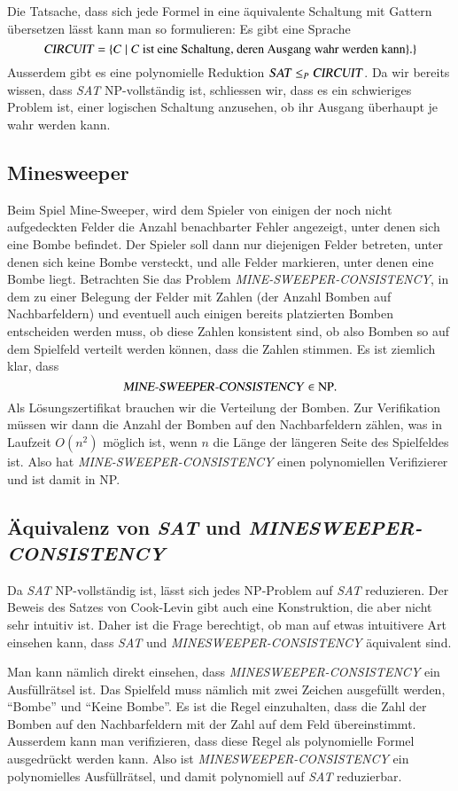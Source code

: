 Die Tatsache, dass sich jede Formel in eine äquivalente Schaltung mit Gattern
übersetzen lässt kann man so formulieren: Es gibt eine Sprache
\[
\text{\textsl{CIRCUIT}}=\{
C\;|\; \text{$C$ ist eine Schaltung, deren Ausgang wahr werden kann}\}.
\}
\]
Ausserdem gibt es eine polynomielle Reduktion
$\text{\textsl{SAT}}\le_P\text{\textsl{CIRCUIT}}$. Da wir bereits wissen,
dass \textsl{SAT} NP-vollständig ist, schliessen wir, dass es ein schwieriges
Problem ist, einer logischen Schaltung anzusehen, ob ihr Ausgang überhaupt
je wahr werden kann.

\subsection{Minesweeper}
Beim Spiel Mine-Sweeper, wird dem Spieler von einigen der noch nicht
aufgedeckten Felder die Anzahl benachbarter Fehler angezeigt, unter
denen sich eine Bombe befindet. Der Spieler soll dann nur diejenigen
Felder betreten, unter denen sich keine Bombe versteckt, und alle
Felder markieren, unter denen eine Bombe liegt. Betrachten Sie das
Problem {\it MINE-SWEEPER-CONSISTENCY}, in dem zu einer Belegung der
Felder mit Zahlen (der Anzahl Bomben auf Nachbarfeldern) und eventuell
auch einigen bereits platzierten Bomben entscheiden
werden muss, ob diese Zahlen konsistent sind, ob also Bomben so
auf dem Spielfeld verteilt werden können, dass die Zahlen stimmen.
Es ist ziemlich klar, dass
\[
\text{\textsl{MINE-SWEEPER-CONSISTENCY}}\in \text{NP}.
\]
Als Lösungszertifikat brauchen wir die Verteilung der Bomben.
Zur Verifikation müssen wir dann die Anzahl der Bomben auf den
Nachbarfeldern zählen, was in Laufzeit $O(n^2)$ möglich ist,
wenn $n$ die Länge der längeren Seite des Spielfeldes ist.
Also hat
\textsl{MINE-SWEEPER-CONSISTENCY} einen polynomiellen Verifizierer und
ist damit in NP.

\subsection{Äquivalenz von \textsl{SAT} und \textsl{MINESWEEPER-CONSISTENCY}}
Da \textsl{SAT} NP-vollständig ist, lässt sich jedes NP-Problem auf
\textsl{SAT} reduzieren. Der Beweis des Satzes von Cook-Levin gibt
auch eine Konstruktion, die aber nicht sehr intuitiv ist.
Daher ist die Frage berechtigt, ob man auf etwas intuitivere Art einsehen
kann, dass
\textsl{SAT}
und
\textsl{MINESWEEPER-CONSISTENCY}
äquivalent sind.

Man kann nämlich direkt einsehen, dass \textsl{MINESWEEPER-CONSISTENCY}
ein Ausfüllrätsel ist.
Das Spielfeld muss nämlich mit zwei Zeichen ausgefüllt werden, ``Bombe''
und ``Keine Bombe''.
Es ist die Regel einzuhalten, dass die Zahl der Bomben auf den Nachbarfeldern
mit der Zahl auf dem Feld übereinstimmt.
Ausserdem kann man verifizieren, dass diese Regel als polynomielle Formel
ausgedrückt werden kann.
Also ist \textsl{MINESWEEPER-CONSISTENCY} ein polynomielles
Ausfüllrätsel, und damit polynomiell auf \textsl{SAT} reduzierbar.

